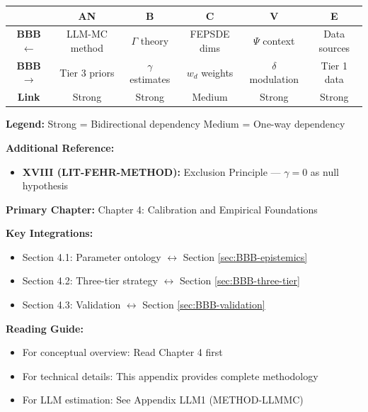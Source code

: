 \begin{tcolorbox}[colback=white, colframe=black,
    title=\textbf{Cross-Reference Map}]

\begin{center}
\small
\begin{tabular}{@{}c|ccccc@{}}
\toprule
& \textbf{AN} & \textbf{B} & \textbf{C} & \textbf{V} & \textbf{E} \\
\midrule
\textbf{BBB $\leftarrow$} & LLM-MC method & $\Gamma$ theory & FEPSDE dims & $\Psi$ context & Data sources \\
\textbf{BBB $\rightarrow$} & Tier 3 priors & $\gamma$ estimates & $w_d$ weights & $\delta$ modulation & Tier 1 data \\
\midrule
\textbf{Link} & \cellcolor{red!20}Strong & \cellcolor{red!20}Strong & \cellcolor{yellow!20}Medium & \cellcolor{red!20}Strong & \cellcolor{red!20}Strong \\
\bottomrule
\end{tabular}
\end{center}

\textbf{Legend:}
\colorbox{red!20}{Strong} = Bidirectional dependency \quad
\colorbox{yellow!20}{Medium} = One-way dependency

\textbf{Additional Reference:}
\begin{itemize}[nosep]
    \item \textbf{XVIII (LIT-FEHR-METHOD):} Exclusion Principle --- $\gamma = 0$ as null hypothesis
\end{itemize}

\end{tcolorbox}


\begin{tcolorbox}[colback=purple!5!white, colframe=purple!75!black,
    title=\textbf{Chapter Linkages}]

\textbf{Primary Chapter:} Chapter 4: Calibration and Empirical Foundations

\textbf{Key Integrations:}
\begin{itemize}[nosep]
    \item Section 4.1: Parameter ontology $\leftrightarrow$ Section \ref{sec:BBB-epistemics}
    \item Section 4.2: Three-tier strategy $\leftrightarrow$ Section \ref{sec:BBB-three-tier}
    \item Section 4.3: Validation $\leftrightarrow$ Section \ref{sec:BBB-validation}
\end{itemize}

\textbf{Reading Guide:}
\begin{itemize}[nosep]
    \item For conceptual overview: Read Chapter 4 first
    \item For technical details: This appendix provides complete methodology
    \item For LLM estimation: See Appendix LLM1 (METHOD-LLMMC)
\end{itemize}

\end{tcolorbox}

